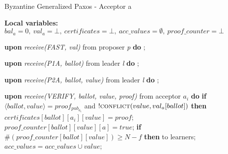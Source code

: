 \begin{algorithm}
\begin{algorithmic}[1]
		\iffalse \State
		\Function{proved\_safe}{Q, m}
		\State $k = max(i\ |\ (i < m) \wedge (\exists a \in Q :\ val_a[i]\ \neq null))$;
		\State $RS = \{R \in k$-$quorum\ |\ \forall a \in R \cap Q : val_a[k] \neq null\}$;
		\State $\gamma(R) = \sqcap \{v_a[k]\ |\ a \in Q \cap R \}$;
		\State $\Gamma = \{\gamma(R)\ |\ R \in RS \}$;
		\State
		\If{$RS = \varnothing$}
		\State \textbf{return} $\{val_a[k]\ |\ (a \in Q) \wedge (val_a[k] \neq null)\}$;
		\Else
		\State \textbf{return} $\sqcup \Gamma$;
		\EndIf
		\EndFunction
		\fi
		
	\end{algorithmic}
\end{algorithm}

\begin{algorithm} 
	\caption{Byzantine Generalized Paxos - Acceptor a}
	\label{BFT-Acc}
	\textbf{Local variables: } $bal_a = 0,\ val_a = \bot,\ certificates = \bot,\ acc\_values = \emptyset,\ proof\_counter = \bot$ 
	\begin{algorithmic}[1]
		
		\State \textbf{upon} \textit{receive(FAST, val)} from proposer \textit{p} \textbf{do}
		\State \hspace{\algorithmicindent} ;
		
		\State
		\State \textbf{upon} \textit{receive(P1A, ballot)} from leader \textit{l} \textbf{do}
		\State \hspace{\algorithmicindent} ;
		
		\State
		\State \textbf{upon} \textit{receive(P2A, ballot, value)} from leader \textit{l} \textbf{do}
		\State \hspace{\algorithmicindent} ; 
		
		\State 
		\State \textbf{upon} \textit{receive(VERIFY, ballot, value, proof)} from acceptor $a_i$ \textbf{do}
		\State \hspace{\algorithmicindent} \textbf{if} $\langle ballot, value \rangle = proof_{pub_{a_i}}$ and $!\Call{conflict}{value,val_a[ballot]}$  \textbf{then}
		\State \hspace{\algorithmicindent}\hspace{\algorithmicindent} $certificates[ballot][a_i][value] = proof$;
		\State \hspace{\algorithmicindent}\hspace{\algorithmicindent} $proof\_counter[ballot][value][a] = true$;
		\State
		\State \hspace{\algorithmicindent} \textbf{if} $\#(proof\_counter[ballot][value]) \geq N-f$ \textbf{then}
		\State \hspace{\algorithmicindent}\hspace{\algorithmicindent}  to learners;
		\State \hspace{\algorithmicindent}\hspace{\algorithmicindent} $acc\_values = acc\_values \cup  value$;
			

\end{algorithmic}
\end{algorithm}
